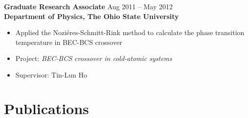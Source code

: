 \documentclass[11pt]{../yhlcv}
\begin{document}
{\bf Graduate Research Associate} \hfill Aug 2011 -- May 2012\vspace{0.25em} \\
{\bf Department of Physics, The Ohio State University}
\vspace{-0.7em}\\
\begin{itemize}[leftmargin=*]\itemsep-0.2em
\item Applied the Nozi\'{e}res-Schmitt-Rink method to calculate the phase transition temperature in
	BEC-BCS crossover
\item[] Project: {\it BEC-BCS crossover in cold-atomic systems}
\item[] Supervisor: Tin-Lun Ho
\end{itemize}

\section*{Publications}
\end{document}
